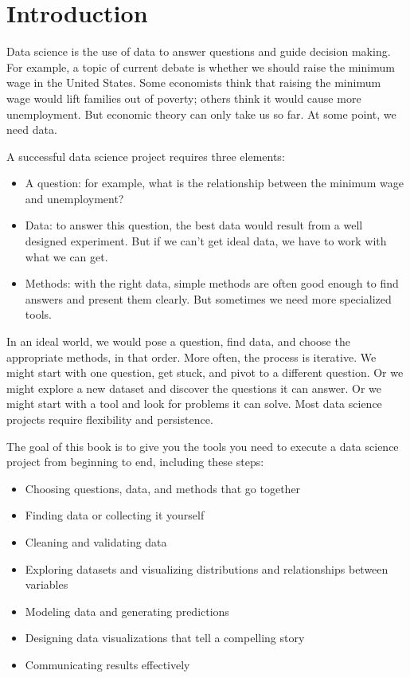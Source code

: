 \section{Introduction}

Data science is the use of data to answer questions and guide decision
making. For example, a topic of current debate is whether we should
raise the minimum wage in the United States. Some economists think that
raising the minimum wage would lift families out of poverty; others
think it would cause more unemployment. But economic theory can only
take us so far. At some point, we need data.

A successful data science project requires three elements:

\begin{itemize}
\item
  A question: for example, what is the relationship between the minimum
  wage and unemployment?
\item
  Data: to answer this question, the best data would result from a
  well designed experiment. But if we can't get ideal data, we have to
  work with what we can get.
\item
  Methods: with the right data, simple methods are often good enough to find
  answers and present them clearly. But sometimes we need more
  specialized tools.
\end{itemize}

In an ideal world, we would pose a question, find data, and choose the
appropriate methods, in that order. More often, the process is
iterative. We might start with one question, get stuck, and pivot to a
different question. Or we might explore a new dataset and discover the
questions it can answer. Or we might start with a tool and look for
problems it can solve. Most data science projects require flexibility
and persistence.

The goal of this book is to give you the tools you need to execute a
data science project from beginning to end, including these steps:

\begin{itemize}
\item
  Choosing questions, data, and methods that go together
\item
  Finding data or collecting it yourself
\item
  Cleaning and validating data
\item
  Exploring datasets and visualizing distributions and relationships
  between variables
\item
  Modeling data and generating predictions
\item
  Designing data visualizations that tell a compelling story
\item
  Communicating results effectively
\end{itemize}

